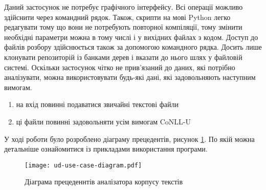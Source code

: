 Даний застосунок не потребує графічного інтерфейсу. Всі операції можливо здійснити
через командний рядок. Також, скрипти на мові Python легко редагувати тому що вони не
потребують повторної компіляції, тому змінити необхідні параметри можна в тому
числі і у вихідних файлах з кодом. Доступ до файлів розбору здійснюється
також за допомогою командного рядка. Досить лише клонувати репозиторій із
банками дерев і вказати до нього шлях у файловій системі. Оскільки застосунок
чітко не прив'язаний до даних, які потрібно аналізувати, можна використовувати будь-які
дані, які задовольняють наступним вимогам.

\begin{enumerate}
    \item на вхід повинні подаватися звичайні текстові файли
    \item ці файли повинні задовольняти усім вимогам CoNLL-U
\end{enumerate}

У ході роботи було розроблено діаграму прецедентів, рисунок \ref{img:use_case_diagram}.
По якій можна детальніше ознайомитися із прикладами використання програми.

\begin{figure}[p]
  \begin{center}
    \texttt{[image: ud-use-case-diagram.pdf]}
  \end{center}
  \caption{Діаграма прецеденнтів аналізатора корпусу текстів}
  \label{img:use_case_diagram}
\end{figure}
\newpage

